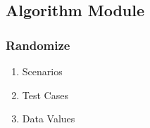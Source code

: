 \documentclass[hidelinks, 12pt, oneside]{article}
\begin{document}
\subsection{Algorithm Module}
\subsubsection{Randomize}
\begin{enumerate}
\item Scenarios
\item Test Cases
\item Data Values
\end{enumerate}
\end{document}
